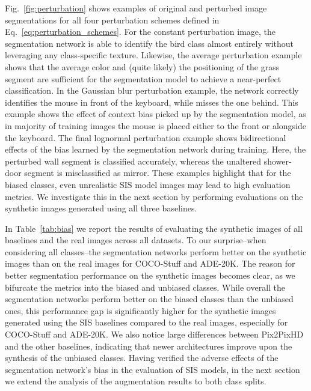 \documentclass[final]{cvpr}
\makeatletter
\newcommand\+{\mkern4mu}
\renewcommand{\paragraph}{\@startsection{paragraph}{4}{\z@}{0.ex plus 0.ex minus .0ex}{-0.5em}{\normalsize\bf}}
\let\originalparagraph\paragraph
\renewcommand{\paragraph}[2][.]{\originalparagraph{#2#1}}
\makeatother
\begin{document}
Fig.~\ref{fig:perturbation} shows examples of original and perturbed image segmentations for all four perturbation schemes defined in Eq.~\ref{eq:perturbation_schemes}. For the constant perturbation image, the segmentation network is able to identify the bird class almost entirely without leveraging any class-specific texture. Likewise, the average perturbation example shows that the average color and (quite likely) the positioning of the grass segment are sufficient for the segmentation model to achieve a near-perfect classification. In the Gaussian blur perturbation example, the network correctly identifies the mouse in front of the keyboard, while misses the one behind. This example shows the effect of context bias picked up by the segmentation model, as in majority of training images the mouse is placed either to the front or alongside the keyboard. The final lognormal perturbation example shows bidirectional effects of the bias learned by the segmentation network during training. Here, the perturbed wall segment is classified accurately, whereas the unaltered shower-door segment is misclassified as mirror. These examples highlight that for the biased classes, even unrealistic SIS model images may lead to high evaluation metrics. We investigate this in the next section by performing evaluations on the synthetic images generated using all three baselines.

\paragraph{Analysis on Baselines}

In Table~\ref{tab:bias} we report the results of evaluating the synthetic images of all baselines and the real images across all datasets. To our surprise--when considering all classes--the segmentation networks perform better on the synthetic images than on the real images for COCO-Stuff and ADE-20K. The reason for better segmentation performance on the synthetic images becomes clear, as we bifurcate the metrics into the biased and unbiased classes. While overall the segmentation networks perform better on the biased classes than the unbiased ones, this performance gap is significantly higher for the synthetic images generated using the SIS baselines compared to the real images, especially for COCO-Stuff and ADE-20K. We also notice large differences between Pix2PixHD and the other baselines, indicating that newer architectures improve upon the synthesis of the unbiased classes. Having verified the adverse effects of the segmentation network's bias in the evaluation of SIS models, in the next section we extend the analysis of the augmentation results to both class splits. 
\end{document}
